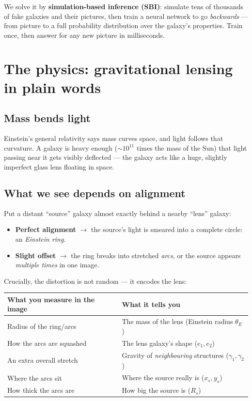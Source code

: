 \documentclass[11pt,a4paper]{article}
\begin{document}
\begin{keyidea}
We solve it by \textbf{simulation-based inference (SBI)}: simulate tens of
thousands of fake galaxies and their pictures, then train a neural network to go
\emph{backwards} --- from picture to a full probability distribution over the
galaxy's properties. Train once, then answer for any new picture in milliseconds.
\end{keyidea}

\section{The physics: gravitational lensing in plain words}

\subsection{Mass bends light}

Einstein's general relativity says mass curves space, and light follows that
curvature. A galaxy is heavy enough ($\sim$$10^{11}$ times the mass of the Sun)
that light passing near it gets visibly deflected --- the galaxy acts like a huge,
slightly imperfect glass lens floating in space.

\subsection{What we see depends on alignment}

Put a distant ``source'' galaxy almost exactly behind a nearby ``lens'' galaxy:

\begin{itemize}
  \item \textbf{Perfect alignment} $\rightarrow$ the source's light is smeared
  into a complete circle: an \emph{Einstein ring}.
  \item \textbf{Slight offset} $\rightarrow$ the ring breaks into stretched
  \emph{arcs}, or the source appears \emph{multiple times} in one image.
\end{itemize}

Crucially, the distortion is not random --- it encodes the lens:

\begin{center}
\begin{tabular}{ll}
\toprule
\textbf{What you measure in the image} & \textbf{What it tells you} \\
\midrule
Radius of the ring/arcs & The mass of the lens (Einstein radius $\theta_E$) \\
How the arcs are squashed & The lens galaxy's shape ($e_1, e_2$) \\
An extra overall stretch & Gravity of \emph{neighbouring} structures ($\gamma_1, \gamma_2$) \\
Where the arcs sit & Where the source really is ($x_s, y_s$) \\
How thick the arcs are & How big the source is ($R_s$) \\
\bottomrule
\end{tabular}
\end{center}
\end{document}
